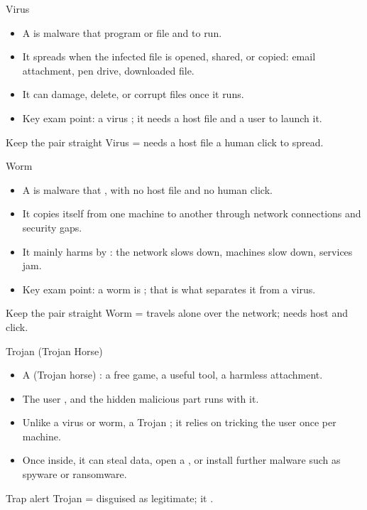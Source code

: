\documentclass[aspectratio=169]{beamer}
\begin{document}
\begin{frame}{Virus}
  \begin{itemize}
    \item A  is malware that 
      program or file and  to run.
    \item It spreads when the infected file is opened, shared, or copied:
      email attachment, pen drive, downloaded file.
    \item It can damage, delete, or corrupt files once it runs.
    \item Key exam point: a virus ; it needs a
      host file and a user to launch it.
  \end{itemize}
  \begin{block}{Keep the pair straight}
    Virus = needs a host file  a human click to spread.
  \end{block}
\end{frame}

\begin{frame}{Worm}
  \begin{itemize}
    \item A  is malware that , with no host file and no human click.
    \item It copies itself from one machine to another through network
      connections and security gaps.
    \item It mainly harms by :
      the network slows down, machines slow down, services jam.
    \item Key exam point: a worm is ;
      that is what separates it from a virus.
  \end{itemize}
  \begin{block}{Keep the pair straight}
    Worm = travels alone over the network; needs  host and
     click.
  \end{block}
\end{frame}

\begin{frame}{Trojan (Trojan Horse)}
  \begin{itemize}
    \item A  (Trojan horse) :
      a free game, a useful tool, a harmless attachment.
    \item The user , and the hidden
      malicious part runs with it.
    \item Unlike a virus or worm, a Trojan ;
      it relies on tricking the user once per machine.
    \item Once inside, it can steal data, open a , or install
      further malware such as spyware or ransomware.
  \end{itemize}
  \begin{alertblock}{Trap alert}
    Trojan = disguised as legitimate; it .
  \end{alertblock}
\end{frame}
\end{document}
